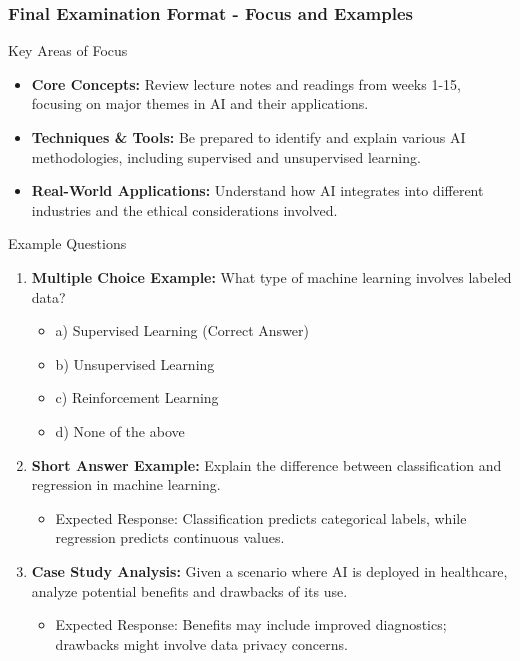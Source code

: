 \documentclass[aspectratio=169]{beamer}
\begin{document}
\begin{frame}[fragile]
    \frametitle{Final Examination Format - Focus and Examples}
    \begin{block}{Key Areas of Focus}
        \begin{itemize}
            \item \textbf{Core Concepts:} Review lecture notes and readings from weeks 1-15, focusing on major themes in AI and their applications.
            \item \textbf{Techniques \& Tools:} Be prepared to identify and explain various AI methodologies, including supervised and unsupervised learning.
            \item \textbf{Real-World Applications:} Understand how AI integrates into different industries and the ethical considerations involved.
        \end{itemize}
    \end{block}
    
    \begin{block}{Example Questions}
        \begin{enumerate}
            \item \textbf{Multiple Choice Example:}
                What type of machine learning involves labeled data?
                \begin{itemize}
                    \item a) Supervised Learning (Correct Answer)
                    \item b) Unsupervised Learning
                    \item c) Reinforcement Learning
                    \item d) None of the above
                \end{itemize}
            \item \textbf{Short Answer Example:}
                Explain the difference between classification and regression in machine learning.
                \begin{itemize}
                    \item Expected Response: Classification predicts categorical labels, while regression predicts continuous values.
                \end{itemize}
            \item \textbf{Case Study Analysis:} 
                Given a scenario where AI is deployed in healthcare, analyze potential benefits and drawbacks of its use.
                \begin{itemize}
                    \item Expected Response: Benefits may include improved diagnostics; drawbacks might involve data privacy concerns.
                \end{itemize}
        \end{enumerate}
    \end{block}
\end{frame}
\end{document}
